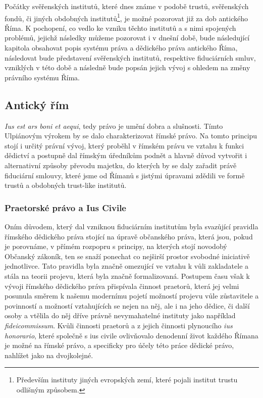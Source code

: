 \documentclass{article}
\begin{document}
Počátky svěřenských institutů, které dnes známe v podobě trustů, svěřenských fondů, či jiných obdobných institutů\footnote{Především instituty jiných evropských zemí, které pojali institut trustu odlišným způsobem.}, je možné pozorovat již za dob antického Říma. K pochopení, co vedlo ke vzniku těchto institutů a s nimi spojených problémů, jejichž následky můžeme pozorovat i v dnešní době, bude následující kapitola obsahovat popis systému práva a dědického práva antického Říma, následovat bude představení svěřenských institutů, respektive fiduciárních s\-mluv, vzniklých v této době a následně bude popsán jejich vývoj s ohledem na změny právního systému Říma.

\subsection{Antický řím}

\textit{Ius est ars boni et aequi}, tedy právo je umění dobra a slušnosti. Tímto Ulpiá\-novým výrokem by se dalo charakterizovat římské právo. Na tomto principu stojí i určitý právní vývoj, který proběhl v římském právu ve vztahu k funkci dědictví a postupně dal římským úředníkům podnět a hlavně důvod vytvořit i alternativní způsoby převodu majetku, do kterých by se daly zařadit právě fiduciární smlouvy, které jsme od Římanů s jistými úpravami zdědili ve formě trustů a obdobných trust-like institutů.%

\subsubsection{Praetorské právo a Ius Civile}

Oním důvodem, který dal vzniknou fiduciárním institutům byla svazůjící pravid\-la římského dědického práva stojící na úpravě občanského práva, která jsou, pokud je porovnáme, v přímém rozpopru s principy, na kterých stojí novodobý Občanský zákoník, ten se snaží ponechat co nejširší prostor svobodné iniciativě jednotlivce. Tato pravidla byla značně omezující ve vztahu k vůli zakladatele a stála na teorii projevu, která byla značně formalizovaná. Postupem času však k vývoji římského dědického práva přispívala činnost praetorů, která jej velmi posunula směrem k našemu modernímu pojetí možností projevu vůle zůstavitele a povinností a možností vztahujících se nejen na něj, ale i na jeho dědice, či další osoby a vtělila do něj dříve právně nevymahatelné instituty jako například \textit{fideicommissum}. Kvůli činnosti praetorů a z jejich činnosti plynoucího \textit{ius honorario}, které společně s {ius civile} ovlivňovalo denodenní život každého Římana je možné na římské právo, a specificky pro účely této práce dědické právo, nahlížet jako na dvojkolejné.\\
\end{document}
